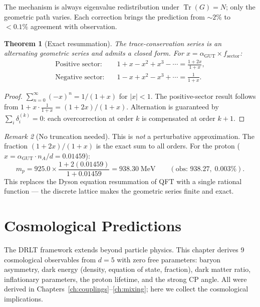 \documentclass[12pt]{article}
\newtheorem{theorem}{Theorem}[section]
\theoremstyle{remark}
\newtheorem{remark}[theorem]{Remark}
\theoremstyle{definition}
\newcommand{\agut}{\alpha_{\mathrm{GUT}}}
\begin{document}
The mechanism is always eigenvalue redistribution under $\operatorname{Tr}(G) = N$; only the geometric path varies.  Each correction brings the prediction from $\sim\!2\%$ to $<\!0.1\%$ agreement with observation.

\begin{theorem}[Exact resummation]
\label{thm:resummation}
The trace-conservation series is an alternating geometric series and admits a closed form.  For $x = \agut \times f_\mathrm{sector}$:
\begin{align}
\text{Positive sector:}&\quad 1 + x - x^2 + x^3 - \cdots = \frac{1 + 2x}{1 + x}, \\
\text{Negative sector:}&\quad 1 - x + x^2 - x^3 + \cdots = \frac{1}{1 + x}.
\end{align}
\end{theorem}

\begin{proof}
$\sum_{n=0}^{\infty}(-x)^n = 1/(1+x)$ for $|x| < 1$.  The positive-sector result follows from $1 + x \cdot \tfrac{1}{1+x} = (1+2x)/(1+x)$.  Alternation is guaranteed by $\sum_i \delta^{(k)}_i = 0$: each overcorrection at order $k$ is compensated at order $k+1$.
\end{proof}

\begin{remark}[No truncation needed]
This is \emph{not} a perturbative approximation.  The fraction $(1+2x)/(1+x)$ is the exact sum to all orders.  For the proton ($x = \agut \cdot n_A/d = 0.01459$):
\begin{equation}
m_p = 925.0 \times \frac{1 + 2(0.01459)}{1 + 0.01459} = 938.30\;\text{MeV}
\qquad (\text{obs: } 938.27,\; 0.003\%).
\end{equation}
This replaces the Dyson equation resummation of QFT with a single rational function --- the discrete lattice makes the geometric series finite and exact.
\end{remark}



\section{Cosmological Predictions}
\label{ch:cosmology}

The DRLT framework extends beyond particle physics. This chapter derives 9 cosmological observables from $d = 5$ with zero free parameters: baryon asymmetry, dark energy (density, equation of state, fraction), dark matter ratio, inflationary parameters, the proton lifetime, and the strong CP angle. All were derived in Chapters~\ref{ch:couplings}--\ref{ch:mixing}; here we collect the cosmological implications.
\end{document}
